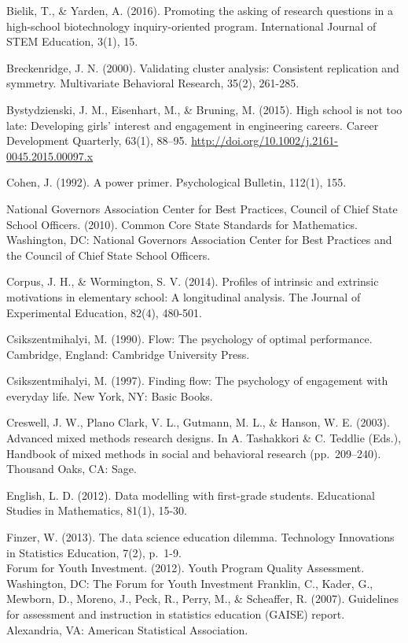 \documentclass[]{book}
\theoremstyle{definition}
\theoremstyle{definition}
\theoremstyle{definition}
\theoremstyle{remark}
\begin{document}
Bielik, T., \& Yarden, A. (2016). Promoting the asking of research
questions in a high-school biotechnology inquiry-oriented program.
International Journal of STEM Education, 3(1), 15.

Breckenridge, J. N. (2000). Validating cluster analysis: Consistent
replication and symmetry. Multivariate Behavioral Research, 35(2),
261-285.

Bystydzienski, J. M., Eisenhart, M., \& Bruning, M. (2015). High school
is not too late: Developing girls' interest and engagement in
engineering careers. Career Development Quarterly, 63(1), 88--95.
\url{http://doi.org/10.1002/j.2161-0045.2015.00097.x}

Cohen, J. (1992). A power primer. Psychological Bulletin, 112(1), 155.

National Governors Association Center for Best Practices, Council of
Chief State School Officers. (2010). Common Core State Standards for
Mathematics. Washington, DC: National Governors Association Center for
Best Practices and the Council of Chief State School Officers.

Corpus, J. H., \& Wormington, S. V. (2014). Profiles of intrinsic and
extrinsic motivations in elementary school: A longitudinal analysis. The
Journal of Experimental Education, 82(4), 480-501.

Csikszentmihalyi, M. (1990). Flow: The psychology of optimal
performance. Cambridge, England: Cambridge University Press.

Csikszentmihalyi, M. (1997). Finding flow: The psychology of engagement
with everyday life. New York, NY: Basic Books.

Creswell, J. W., Plano Clark, V. L., Gutmann, M. L., \& Hanson, W. E.
(2003). Advanced mixed methods research designs. In A. Tashakkori \& C.
Teddlie (Eds.), Handbook of mixed methods in social and behavioral
research (pp.~209--240). Thousand Oaks, CA: Sage.

English, L. D. (2012). Data modelling with first-grade students.
Educational Studies in Mathematics, 81(1), 15-30.

Finzer, W. (2013). The data science education dilemma. Technology
Innovations in Statistics Education, 7(2), p.~1-9.\\
Forum for Youth Investment. (2012). Youth Program Quality Assessment.
Washington, DC: The Forum for Youth Investment Franklin, C., Kader, G.,
Mewborn, D., Moreno, J., Peck, R., Perry, M., \& Scheaffer, R. (2007).
Guidelines for assessment and instruction in statistics education
(GAISE) report. Alexandria, VA: American Statistical Association.
\end{document}
